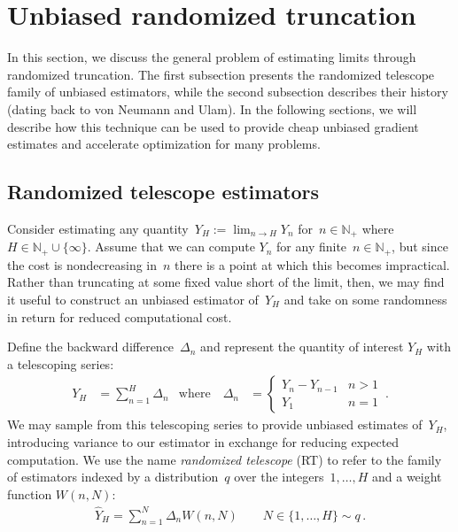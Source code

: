 \section{Unbiased randomized truncation}
In this section, we discuss the general problem of estimating limits through randomized truncation.
The first subsection presents the randomized telescope family of unbiased estimators, while the second subsection describes their history (dating back to von Neumann and Ulam).
In the following sections, we will describe how this technique can be used to provide cheap unbiased gradient estimates and accelerate optimization for many problems.

\subsection{Randomized telescope estimators}
Consider estimating any quantity~${Y_H := \lim_{n \to H} Y_n}$ for~${n\in\mathbb{N}_{+}}$ where~${H\in\mathbb{N}_{+}\cup\{\infty\}}$.
Assume that we can compute $Y_n$ for any finite~${n\in\mathbb{N}_{+}}$, but since the cost is nondecreasing in~$n$ there is a point at which this becomes impractical.
Rather than truncating at some fixed value short of the limit, then, we may find it useful to construct an unbiased estimator of~$Y_H$ and take on some randomness in return for reduced computational cost.

Define the backward difference~$\Delta_n$ and represent the quantity of interest $Y_H$ with a telescoping series:
\begin{align*}
Y_H &= \sum_{n=1}^H \Delta_n & \text{where}\quad    \Delta_n &= \begin{cases}
    Y_n - Y_{n-1} & n > 1\\
    Y_1 & n = 1
    \end{cases}\,.
\end{align*}
We may sample from this telescoping series to provide unbiased estimates of~$Y_H$, introducing variance to our estimator in exchange for reducing expected computation.
We use the name \emph{randomized telescope} (RT) to refer to the family of estimators indexed by a distribution~$q$ over the integers~${1,\ldots,H}$ and a weight function $W(n, N)$:
\begin{align}\label{eq:rt_general}
\hat{Y}_H = \sum_{n=1}^N \Delta_n W(n, N) \quad \quad  N \in \{1,\ldots,H\} \sim q\,.
\end{align}

